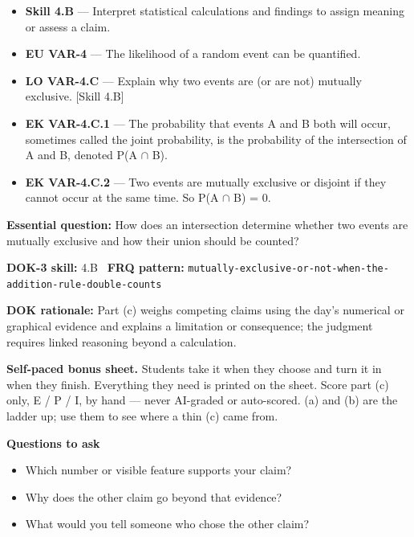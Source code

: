\documentclass[11pt]{article}
\begin{document}


{\small
\begin{itemize}[leftmargin=1.5em,itemsep=2pt,topsep=2pt]
  \item \textbf{Skill 4.B} --- Interpret statistical calculations and findings to assign meaning or assess a claim.
  \item \textbf{EU VAR-4} --- The likelihood of a random event can be quantified.
  \item \textbf{LO VAR-4.C} --- Explain why two events are (or are not) mutually exclusive. [Skill 4.B]
  \item \textbf{EK VAR-4.C.1} --- The probability that events A and B both will occur, sometimes called the joint probability, is the probability of the intersection of A and B, denoted P(A $\cap$ B).
  \item \textbf{EK VAR-4.C.2} --- Two events are mutually exclusive or disjoint if they cannot occur at the same time. So P(A $\cap$ B) = 0.
\end{itemize}
}
\textbf{Essential question:} How does an intersection determine whether two events are mutually exclusive and how their union should be counted?\par
\textbf{DOK-3 skill:} 4.B \textperiodcentered\ \textbf{FRQ pattern:} {\small\texttt{mutually-\allowbreak{}exclusive-\allowbreak{}or-\allowbreak{}not-\allowbreak{}when-\allowbreak{}the-\allowbreak{}addition-\allowbreak{}rule-\allowbreak{}double-\allowbreak{}counts}}\par
\textbf{DOK rationale:} Part (c) weighs competing claims using the day's numerical or graphical evidence and explains a limitation or consequence; the judgment requires linked reasoning beyond a calculation.\par

\textbf{Self-paced bonus sheet.} Students take it when they choose and turn it in when they finish. Everything they need is printed on the sheet. Score part (c) only, E / P / I, by hand --- never AI-graded or auto-scored. (a) and (b) are the ladder up; use them to see where a thin (c) came from.\par

\textbf{Questions to ask}
\begin{itemize}[leftmargin=1.5em,itemsep=2pt,topsep=2pt]
  \item Which number or visible feature supports your claim?
  \item Why does the other claim go beyond that evidence?
  \item What would you tell someone who chose the other claim?
\end{itemize}
\end{document}
